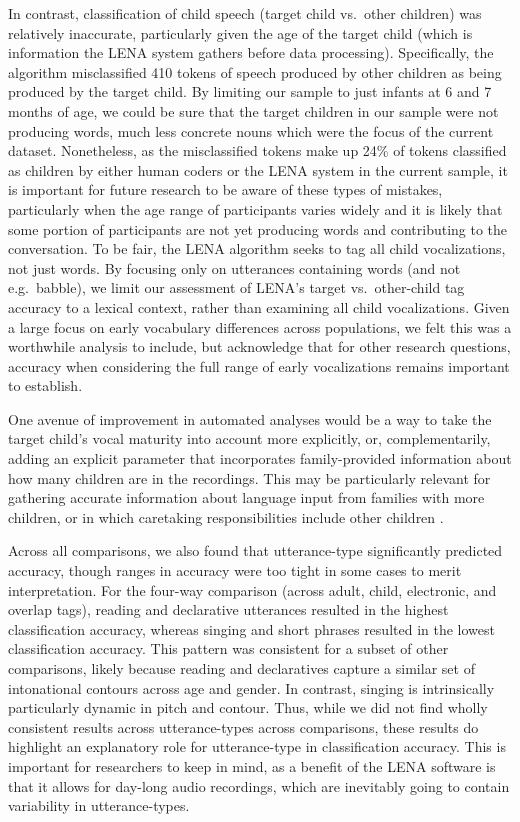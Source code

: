 \documentclass[man,floatsintext]{apa6}
\theoremstyle{definition}
\theoremstyle{definition}
\theoremstyle{definition}
\theoremstyle{remark}
\begin{document}
In contrast, classification of child speech (target child vs.~other
children) was relatively inaccurate, particularly given the age of the
target child (which is information the LENA system gathers before data
processing). Specifically, the algorithm misclassified 410 tokens of
speech produced by other children as being produced by the target child.
By limiting our sample to just infants at 6 and 7 months of age, we
could be sure that the target children in our sample were not producing
words, much less concrete nouns which were the focus of the current
dataset. Nonetheless, as the misclassified tokens make up 24\% of tokens
classified as children by either human coders or the LENA system in the
current sample, it is important for future research to be aware of these
types of mistakes, particularly when the age range of participants
varies widely and it is likely that some portion of participants are not
yet producing words and contributing to the conversation. To be fair,
the LENA algorithm seeks to tag all child vocalizations, not just words.
By focusing only on utterances containing words (and not e.g.~babble),
we limit our assessment of LENA's target vs.~other-child tag accuracy to
a lexical context, rather than examining all child vocalizations. Given
a large focus on early vocabulary differences across populations, we
felt this was a worthwhile analysis to include, but acknowledge that for
other research questions, accuracy when considering the full range of
early vocalizations remains important to establish.

One avenue of improvement in automated analyses would be a way to take
the target child's vocal maturity into account more explicitly, or,
complementarily, adding an explicit parameter that incorporates
family-provided information about how many children are in the
recordings. This may be particularly relevant for gathering accurate
information about language input from families with more children, or in
which caretaking responsibilities include other children \citep[as is
particularly the case for low-SES homes,][]{Division2015}.

Across all comparisons, we also found that utterance-type significantly
predicted accuracy, though ranges in accuracy were too tight in some
cases to merit interpretation. For the four-way comparison (across
adult, child, electronic, and overlap tags), reading and declarative
utterances resulted in the highest classification accuracy, whereas
singing and short phrases resulted in the lowest classification
accuracy. This pattern was consistent for a subset of other comparisons,
likely because reading and declaratives capture a similar set of
intonational contours across age and gender. In contrast, singing is
intrinsically particularly dynamic in pitch and contour. Thus, while we
did not find wholly consistent results across utterance-types across
comparisons, these results do highlight an explanatory role for
utterance-type in classification accuracy. This is important for
researchers to keep in mind, as a benefit of the LENA software is that
it allows for day-long audio recordings, which are inevitably going to
contain variability in utterance-types.
\end{document}
